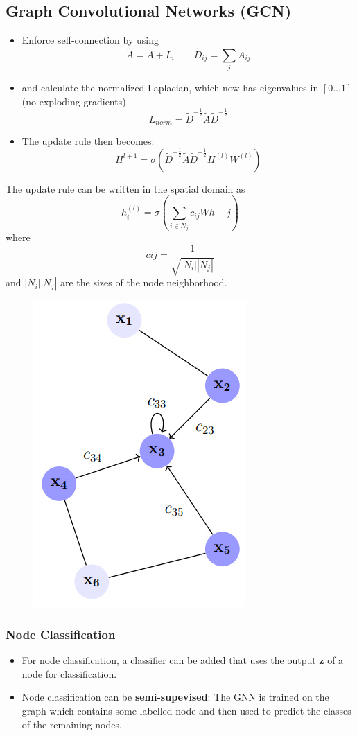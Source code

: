 \subsection{Graph Convolutional Networks (GCN)}
\begin{itemize}
    \item Enforce self-connection by using\[
    \tilde{A} = A + I_n \qquad \tilde{D}_{ij} = \sum_{j}^{}\tilde{A}_{ij}
    \]
    \item and calculate the normalized Laplacian, which now has eigenvalues in \([0 \dots 1]\) (no exploding gradients)
    \[
    L_{norm} = \tilde{D}^{-\frac{1}{2}}\tilde{A}\tilde{D}^{-\frac{1}{2}}
    \]
    \item The update rule then becomes:
    \[
    H^{l+1} = \sigma(\tilde{D}^{-\frac{1}{2}}\tilde{A}\tilde{D}^{-\frac{1}{2}}H^{(l)}W^{(l)})
    \]
\end{itemize}
The update rule can be written in the spatial domain as 
\[
h_i^{(l)} = \sigma\left(\sum_{i \in N_j}c_{ij}Wh-j\right)
\]
where
\[
c{ij} = \frac{1}{\sqrt{|N_i||N_j|}}
\]
and \(|N_i||N_j|\) are the sizes of the node neighborhood.
\begin{figure}[!h]
    \centering
    \includegraphics[width = 0.3\columnwidth]{figures/GraphNeuralNetworks2/GCN.png}
\end{figure}
\subsubsection{Node Classification}
\begin{itemize}
    \item For node classification, a classifier can be added that uses the output \(\mathbf{z}\) of a node for classification.
    \item Node classification can be \textbf{semi-supevised}: The GNN is trained on the graph which contains some labelled node and then used to predict the classes of the remaining nodes.
\end{itemize}

